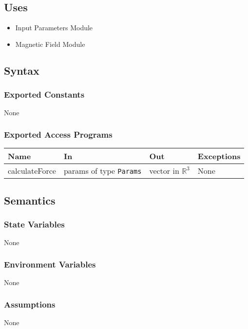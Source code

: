 \documentclass[12pt, titlepage]{article}
\begin{document}
\subsection{Uses}
\begin{itemize}
  \item Input Parameters Module 
  \item Magnetic Field Module
\end{itemize}

\subsection{Syntax}

\subsubsection{Exported Constants}
None 

\subsubsection{Exported Access Programs}
\begin{center}
  \begin{tabular}{p{3cm} p{4cm} p{4cm} p{3cm}}
  \hline
  \textbf{Name} & \textbf{In} & \textbf{Out} & \textbf{Exceptions} \\
  \hline
  calculateForce & params of type \texttt{Params} & vector in $\mathbb{R}^3$ & None \\
  \hline
  \end{tabular}
  \end{center}

\subsection{Semantics}

\subsubsection{State Variables}
None

\subsubsection{Environment Variables}
None

\subsubsection{Assumptions}
None 
\end{document}
